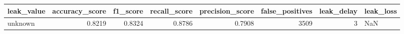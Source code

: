 \begin{tabular}{lrrrrrrl}
\toprule
leak\_value & accuracy\_score & f1\_score & recall\_score & precision\_score & false\_positives & leak\_delay & leak\_loss \\
\midrule
unknown & 0.8219 & 0.8324 & 0.8786 & 0.7908 & 3509 & 3 & NaN \\
\bottomrule
\end{tabular}

